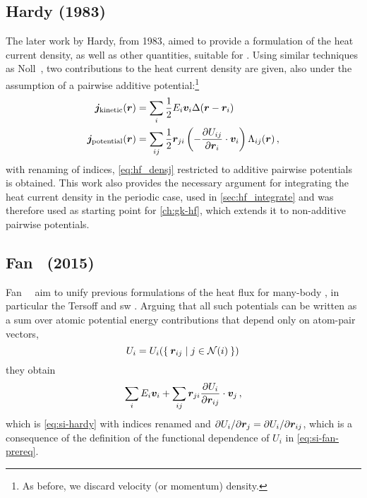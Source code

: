 \subsection{Hardy (1983)}

The later work by Hardy, from 1983, aimed to provide a formulation of the heat current density, as well as other quantities, suitable for \md. Using similar techniques as Noll~\cite{n1955t}, two contributions to the heat current density are given, also under the assumption of a pairwise additive potential:\footnote{As before, we discard velocity (or momentum) density.}
\begin{align}
	\boldsymbol{j}_{\text{kinetic}}(\boldsymbol{r}) &= \sum_i \frac{1}{2} E_i \boldsymbol{v}_i \Delta(\boldsymbol{r}-\boldsymbol{r}_i) \\
	\boldsymbol{j}_{\text{potential}}(\boldsymbol{r}) &= \sum_{ij} \frac{1}{2} \boldsymbol{r}_{ji} \left(-\frac{\partial U_{ij}}{\partial \boldsymbol{r}_{i}} \cdot \boldsymbol{v}_i\right) \Lambda_{ij}(\boldsymbol{r}) \,,
\end{align}
with renaming of indices, \cref{eq:hf_densj} restricted to additive pairwise potentials is obtained. This work also provides the necessary argument for integrating the heat current density in the periodic case, used in \cref{sec:hf_integrate} and was therefore used as starting point for \cref{ch:gk-hf}, which extends it to non-additive pairwise potentials.



\subsection{Fan~\etal{} (2015)}

Fan~\etal~\cite{fpdh2015t} aim to unify previous formulations of the heat flux for many-body \ffs, in particular the Tersoff and \gls{sw} \ffs. Arguing that all such potentials can be written as a sum over atomic potential energy contributions that depend only on atom-pair vectors,
\begin{equation}
	U_i=U_i(\curlyset{\R_{ij}}{j\in\nbh{i}}) \, \label{eq:si-fan-prereq}
\end{equation}
they obtain
\begin{equation}
	\sum_i E_i \V_i + \sum_{ij} \R_{ji} \dur{i}{i}{j} \cdot \V_j \,, \label{eq:si-fan}
\end{equation}
which is \cref{eq:si-hardy} with indices renamed and $\partial U_{i} / \partial \boldsymbol{r}_{j}=\partial U_{i} / \partial \boldsymbol{r}_{ij}$, which is a consequence of the definition of the functional dependence of $U_i$ in \cref{eq:si-fan-prereq}.

